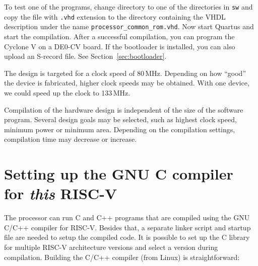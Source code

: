 \documentclass[12pt]{article}
\begin{document}
To test one of the programs, change directory to one of the directories in \lstinline|sw| and copy the file with \lstinline|.vhd| extension to the directory containing the VHDL description under the name \lstinline|processor_common_rom.vhd|.
Now start Quartus and start the compilation. After a successful compilation, you can program the Cyclone V on a DE0-CV board. If the bootloader is installed, you can also upload an S-record file. See Section~\ref{sec:bootloader}.

The design is targeted for a clock speed of 80\,MHz. Depending on how ``good'' the device is fabricated, higher clock speeds may be obtained. With one device, we could speed up the clock to 133\,MHz.

Compilation of the hardware design is independent of the size of the software program. Several design goals may be selected, such as highest clock speed, minimum power or minimum area. Depending on the compilation settings, compilation time may decrease or increase.


\section{Setting up the GNU C compiler for \textit{this} RISC-V}
\label{sec:ccompiler}
The processor can run C and C++ programs that are compiled using the GNU C/C++ compiler for RISC-V. Besides that, a separate linker script and startup file are needed to setup the compiled code. It is possible to set up the C library for multiple RISC-V architecture versions and select a version during compilation. Building the C/C++ compiler (from Linux) is straightforward:
\end{document}
